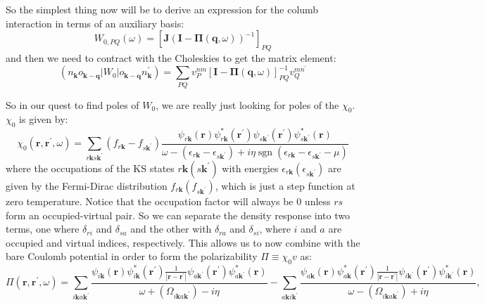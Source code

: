 So the simplest thing now will be to derive an expression for the columb interaction in terms of an auxiliary basis:
\begin{equation}
W_{0, PQ}(\omega)=\left[\mathbf{J}(\mathbf{I}-\mathbf{\Pi}(\mathbf{q}, \omega))^{-1}\right]_{PQ}
\end{equation}
and then we need to contract with the Choleskies to get the matrix element:
\begin{equation}
    (n_{\mathbf{k}}o_{\mathbf{k-q}}|W_0|o_{\mathbf{k-q}}n^\prime_{\mathbf{k}}) =\sum_{PQ} v_{P}^{nm}\left[\mathbf{I}-\mathbf{\Pi}\left(\mathbf{q}, \omega\right)\right]_{PQ}^{-1} v_{Q}^{mn^{\prime}}
\end{equation}

So in our quest to find poles of $W_0$, we are really just looking for poles of the $\chi_0$. $\chi_0$ is given by:
\begin{equation}
\chi_{0}\left(\mathbf{r}, \mathbf{r}^{\prime}, \omega\right)=\sum_{r\mathbf{k} s \mathbf{k}^{\prime}}\left(f_{r \mathbf{k}}-f_{s \mathbf{k}^{\prime}}\right) \frac{\psi_{r \mathbf{k}}(\mathbf{r}) \psi_{r \mathbf{k}}^{*}\left(\mathbf{r}^{\prime}\right) \psi_{s \mathbf{k}^{\prime}}\left(\mathbf{r}^{\prime}\right) \psi_{s \mathbf{k}^{\prime}}^{*}(\mathbf{r})}{\omega-\left(\epsilon_{r \mathbf{k}}-\epsilon_{s \mathbf{k}^{\prime}}\right)+i \eta \operatorname{sgn}\left(\epsilon_{r \mathbf{k}}-\epsilon_{s \mathbf{k}^{\prime} } - \mu\right)}
\end{equation}
where the occupations of the KS states \(r\mathbf{k}(s\mathbf{k}^{\prime})\) with energies \(\epsilon_{r\mathbf{k}}(\epsilon_{s\mathbf{k}^{\prime}})\) are given by the Fermi-Dirac distribution \(f_{r\mathbf{k}}(f_{s\mathbf{k}^{\prime}})\), which is just a step function at zero temperature. Notice that the occupation factor will always be 0 unless \(rs\) form an occupied-virtual pair. So we can separate the density response into two terms, one where \(\delta_{ri}\) and \(\delta_{sa}\) and the other with \(\delta_{ra}\) and \(\delta_{si}\), where \(i\) and \(a\) are occupied and virtual indices, respectively. This allows us to now combine with the bare Coulomb potential in order to form the polarizability \(\Pi\equiv \chi_0v\) as:
\begin{equation}
\Pi\left(\mathbf{r}, \mathbf{r}^{\prime}, \omega\right)=\sum_{i\mathbf{k}a\mathbf{k}^{\prime}}\frac{\psi_{i\mathbf{k}}(\mathbf{r}) \psi_{i\mathbf{k}}^{*}\left(\mathbf{r}^{\prime}\right)\frac{1}{|\mathbf{r}-\mathbf{r}^\prime|} \psi_{a\mathbf{k}^{\prime}}\left(\mathbf{r}^{\prime}\right) \psi_{a\mathbf{k}^{\prime}}^{*}(\mathbf{r})}{\omega+\left(\Omega_{i\mathbf{k}a\mathbf{k}^{\prime}}\right)-i\eta } - \sum_{a\mathbf{k}i\mathbf{k}^{\prime}}\frac{\psi_{a\mathbf{k}}(\mathbf{r}) \psi_{a\mathbf{k}}^{*}\left(\mathbf{r}^{\prime}\right) \frac{1}{|\mathbf{r}-\mathbf{r}^\prime|}\psi_{i\mathbf{k}^{\prime}}\left(\mathbf{r}^{\prime}\right) \psi_{i\mathbf{k}^{\prime}}^{*}(\mathbf{r})}{\omega-\left(\Omega_{i\mathbf{k}a\mathbf{k}^{\prime}}\right)+i\eta },
\end{equation}
